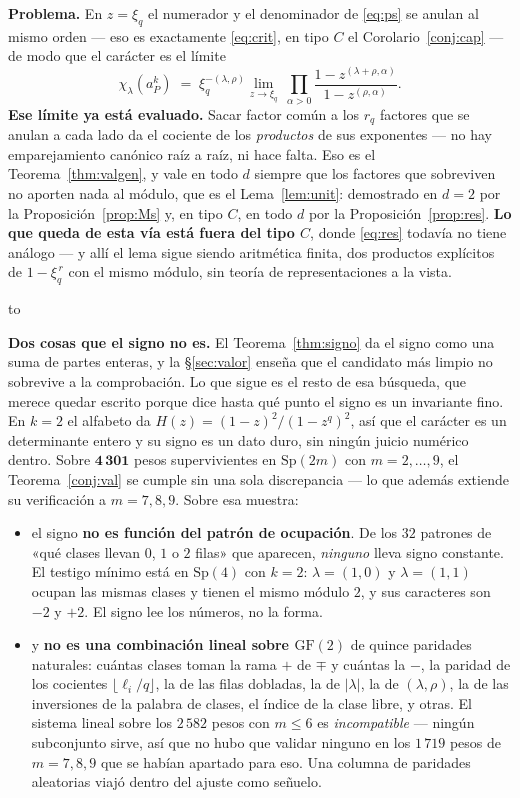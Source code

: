 \documentclass[11pt,a4paper]{article}
\newcommand{\Sp}{\mathrm{Sp}}
\newenvironment{keybox}
  {\par\vspace{9pt}\begin{lrbox}{\fichabox}%
   \begin{minipage}{0.90\textwidth}\vspace{7pt}\setlength{\parskip}{3pt}}
  {\vspace{7pt}\end{minipage}\end{lrbox}%
   \par\noindent\hbox to \textwidth{\hfill
   \textcolor{azul}{\rule[-\dp\fichabox]{3.2pt}{\dimexpr\ht\fichabox+\dp\fichabox\relax}}%
   \colorbox{fondoficha}{\usebox{\fichabox}}\hfill}%
   \par\vspace{9pt}}
\begin{document}
\begin{keybox}
\textbf{Problema.} En $z=\xi_q$ el numerador y el denominador de \eqref{eq:ps} se anulan al mismo
orden --- eso es exactamente \eqref{eq:crit}, en tipo $C$ el Corolario~\ref{conj:cap} --- de modo que el
carácter es el límite
\[
\chi_\lambda(a_P^k)\;=\;\xi_q^{-(\lambda,\rho)}\lim_{z\to\xi_q}\ \prod_{\alpha>0}
\frac{1-z^{(\lambda+\rho,\alpha)}}{1-z^{(\rho,\alpha)}} .
\]
\textbf{Ese límite ya está evaluado.} Sacar factor común a
los $r_q$ factores que se anulan a cada lado da el cociente de los \emph{productos} de sus
exponentes --- no hay emparejamiento canónico raíz a raíz, ni hace falta. Eso es el
Teorema~\ref{thm:valgen}, y vale en todo $d$ siempre que los factores que sobreviven no aporten nada
al módulo, que es el Lema~\ref{lem:unit}: demostrado en $d=2$ por la Proposición~\ref{prop:Ms} y, en
tipo $C$, en todo $d$ por la Proposición~\ref{prop:res}. \textbf{Lo que queda de esta vía está fuera
del tipo $C$}, donde \eqref{eq:res} todavía no tiene análogo --- y allí el lema sigue siendo
aritmética finita, dos productos explícitos de $1-\xi_q^{\,r}$ con el mismo módulo, sin teoría de
representaciones a la vista.
\end{keybox}

\smallskip
\noindent\textbf{Dos cosas que el signo no es.} El Teorema~\ref{thm:signo} da el signo como una suma
de partes enteras, y la \S\ref{sec:valor} enseña que el candidato más limpio no sobrevive a la
comprobación. Lo que sigue es el resto de esa búsqueda, que merece quedar escrito porque dice hasta
qué punto el signo es un invariante fino. En $k=2$ el alfabeto da $H(z)=(1-z)^2/(1-z^q)^2$, así que el
carácter es un determinante entero y su signo es un dato duro, sin ningún juicio numérico dentro.
Sobre $\mathbf{4\,301}$ pesos supervivientes en $\Sp(2m)$ con $m=2,\dots,9$, el
Teorema~\ref{conj:val} se cumple sin una sola discrepancia --- lo que además extiende su verificación
a $m=7,8,9$. Sobre esa muestra:

\begin{itemize}\itemsep2pt
\item el signo \textbf{no es función del patrón de ocupación}. De los $32$ patrones de «qué clases
llevan $0$, $1$ o $2$ filas» que aparecen, \emph{ninguno} lleva signo constante. El testigo mínimo
está en $\Sp(4)$ con $k=2$: $\lambda=(1,0)$ y $\lambda=(1,1)$ ocupan las mismas clases y tienen
el mismo módulo $2$, y sus caracteres son $-2$ y $+2$. El signo lee los números, no la forma.
\item y \textbf{no es una combinación lineal sobre $\mathrm{GF}(2)$} de quince paridades naturales:
cuántas clases toman la rama $+$ de $\mp$ y cuántas la $-$, la paridad de los cocientes
$\lfloor\ell_i/q\rfloor$, la de las filas dobladas, la de $|\lambda|$, la de $(\lambda,\rho)$, la de
las inversiones de la palabra de clases, el índice de la clase libre, y otras. El sistema lineal
sobre los $2\,582$ pesos con $m\le6$ es \emph{incompatible} --- ningún subconjunto sirve, así que no
hubo que validar ninguno en los $1\,719$ pesos de $m=7,8,9$ que se habían apartado para eso. Una
columna de paridades aleatorias viajó dentro del ajuste como señuelo.
\end{itemize}
\end{document}
